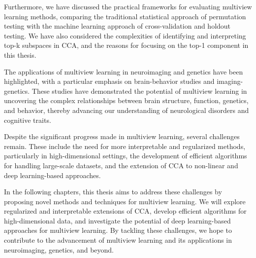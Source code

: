 Furthermore, we have discussed the practical frameworks for evaluating multiview learning methods, comparing the traditional statistical approach of permutation testing with the machine learning approach of cross-validation and holdout testing. We have also considered the complexities of identifying and interpreting top-k subspaces in CCA, and the reasons for focusing on the top-1 component in this thesis.

The applications of multiview learning in neuroimaging and genetics have been highlighted, with a particular emphasis on brain-behavior studies and imaging-genetics. These studies have demonstrated the potential of multiview learning in uncovering the complex relationships between brain structure, function, genetics, and behavior, thereby advancing our understanding of neurological disorders and cognitive traits.

Despite the significant progress made in multiview learning, several challenges remain. These include the need for more interpretable and regularized methods, particularly in high-dimensional settings, the development of efficient algorithms for handling large-scale datasets, and the extension of CCA to non-linear and deep learning-based approaches.

In the following chapters, this thesis aims to address these challenges by proposing novel methods and techniques for multiview learning. We will explore regularized and interpretable extensions of CCA, develop efficient algorithms for high-dimensional data, and investigate the potential of deep learning-based approaches for multiview learning. By tackling these challenges, we hope to contribute to the advancement of multiview learning and its applications in neuroimaging, genetics, and beyond.
